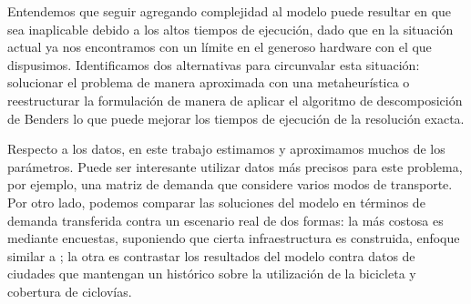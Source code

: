 Entendemos que seguir agregando complejidad al modelo puede resultar en que sea inaplicable debido a los altos tiempos de ejecución, dado que en la situación actual ya nos encontramos con un límite en el generoso hardware con el que dispusimos. Identificamos dos alternativas para circunvalar esta situación: solucionar el problema de manera aproximada con una metaheurística o reestructurar la formulación de manera de aplicar el algoritmo de descomposición de Benders \parencite{bucarey2022, crainic2021} lo que puede mejorar los tiempos de ejecución de la resolución exacta.

Respecto a los datos, en este trabajo estimamos y aproximamos muchos de los parámetros. Puede ser interesante utilizar datos más precisos para este problema, por ejemplo, una matriz de demanda que considere varios modos de transporte. Por otro lado, podemos comparar las soluciones del modelo en términos de demanda transferida contra un escenario real de dos formas: la más costosa es mediante encuestas, suponiendo que cierta infraestructura es construida, enfoque similar a \textcite{shwe2014}; la otra es contrastar los resultados del modelo contra datos de ciudades que mantengan un histórico sobre la utilización de la bicicleta y cobertura de ciclovías.
